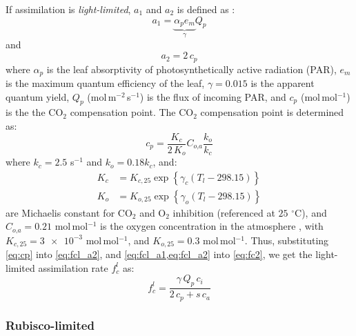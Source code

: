 If assimilation is \textit{light-limited}, $a_1$ and $a_2$ is defined as \citep{Manoli2014,Katul2010}:
\begin{equation}
a_1 = \underbrace{\alpha_p e_m}_{\gamma} Q_p
\label{eq:fcl_a1}
\end{equation}
and 
\begin{equation}
a_2 = 2\,c_p
\label{eq:fcl_a2}
\end{equation}
where $\alpha_p$ is the leaf absorptivity of photosynthetically active radiation (PAR), $e_m$ is the maximum quantum efficiency of the leaf, $\gamma = 0.015$ is the apparent quantum yield, $Q_p$ (mol\,m$^{-2}$\,s$^{-1}$) is the flux of incoming PAR, and $c_p$ (mol\,mol$^{-1}$) is the the CO$_2$ compensation point. The CO$_2$ compensation point is determined as:
\begin{equation}
c_p = \frac{K_c}{2\,K_o} C_{\textit{o,a}} \frac{k_o}{k_c}
\label{eq:cp}
\end{equation}
where $k_c = 2.5$ s$^{-1}$ and $k_o = 0.18 k_c$, and:
\begin{align}
K_c &= K_{c,25} \exp\left\{ \gamma_c \left(T_l - 298.15\right)\right\} \\
K_o &= K_{o,25} \exp\left\{ \gamma_o \left(T_l - 298.15\right)\right\}
\end{align}
are Michaelis constant for CO$_2$ and O$_2$ inhibition (referenced at $25$ $^{\circ}$C), and $C_{\textit{o,a}} = 0.21$ mol\,mol$^{-1}$ is the oxygen concentration in the atmosphere \citep{Farquhar1980}, with $K_{c,25} = \num{3e-3}$ mol\,mol$^{-1}$, and $K_{o,25} = 0.3$ mol\,mol$^{-1}$. Thus, substituting \cref{eq:cp} into \cref{eq:fcl_a2}, and  \cref{eq:fcl_a1,eq:fcl_a2} into \cref{eq:fc2}, we get the light-limited assimilation rate $f_c^l$ as:
\begin{equation}
f_c^l = \frac{\gamma\,Q_p\,c_i}{2\,c_p + s\,c_a}
\end{equation}

\subsubsection*{Rubisco-limited}

